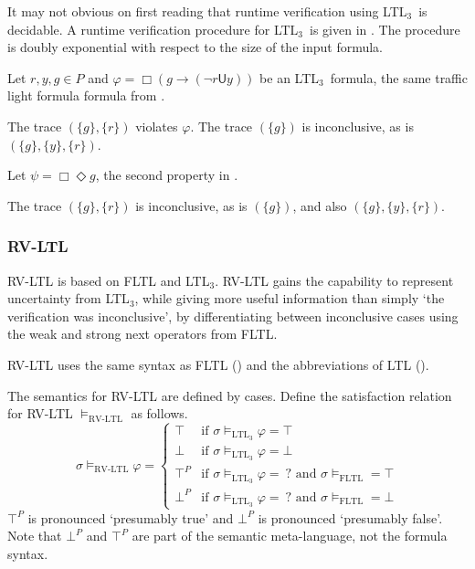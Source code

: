 \documentclass[a4paper]{article}
\newcommand{\U}{\mathsf{U}}
\newcommand{\tand}{\text{ and }}
\newcommand{\ltlt}{LTL$_3$}
\begin{document}
It may not obvious on first reading that runtime verification using \ltlt\ is decidable. A runtime verification procedure for \ltlt\ is given in \textcite[6]{arafat2005runtime}. The procedure is doubly exponential with respect to the size of the input formula.

\begin{eg}
Let $r,y,g\in P$ and $\varphi = \Box (g \to (\neg r \U y))$ be an \ltlt\ formula, the same traffic light formula formula from .

  The trace $(\{g\},\{r\})$ violates $\varphi$. The trace $(\{g\})$ is inconclusive, as is $(\{g\},\{y\},\{r\})$.

  Let $\psi = \Box \Diamond g $, the second property in .

  The trace $(\{g\},\{r\})$ is inconclusive, as is $(\{g\})$, and also $(\{g\},\{y\},\{r\})$.
\end{eg}

\subsubsection{RV-LTL} RV-LTL is based on FLTL and \ltlt. RV-LTL gains the capability to represent uncertainty from \ltlt, while giving more useful information than simply `the verification was inconclusive', by differentiating between inconclusive cases using the weak and strong next operators from FLTL.


RV-LTL uses the same syntax as FLTL () and the abbreviations of LTL ().

\begin{defn}\label{rvltlsem}

  The semantics for RV-LTL are defined by cases.
  Define the satisfaction relation for RV-LTL $\vDash_{\text{RV-LTL}}$ as follows.
  \[\sigma\vDash_{\text{RV-LTL}}\varphi =
    \begin{cases}
      \top & \text{if } \sigma \vDash_{\text{\ltlt}} \varphi = \top\\
      \bot & \text{if } \sigma \vDash_{\text{\ltlt}} \varphi = \bot\\
      \top^P & \text{if } \sigma \vDash_{\text{\ltlt}} \varphi = ~?\tand \sigma\vDash_{\text{FLTL}} = \top \\
      \bot^P & \text{if } \sigma \vDash_{\text{\ltlt}} \varphi = ~?\tand \sigma\vDash_{\text{FLTL}} = \bot
    \end{cases}
  \]
  $\top^P$ is pronounced `presumably true' and $\bot^P$ is pronounced `presumably false'.
  Note that $\bot^P$ and $\top^P$ are part of the semantic meta-language, not the formula syntax.
\end{defn}
\end{document}
